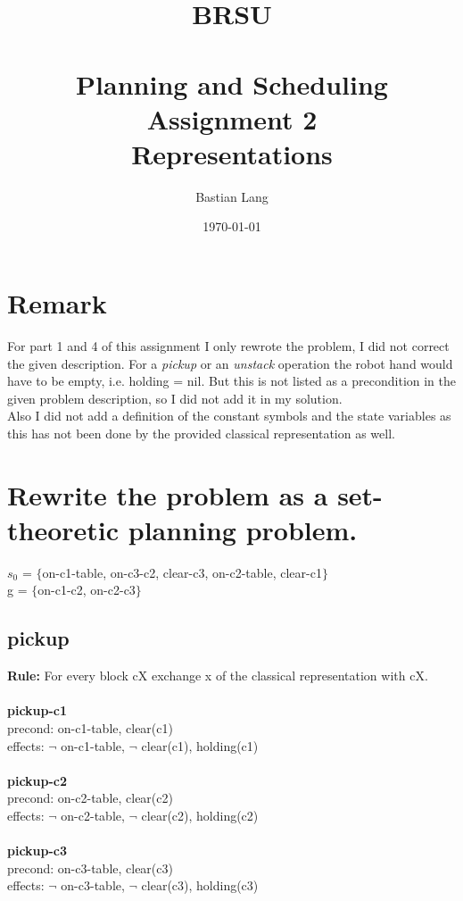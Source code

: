 \documentclass[paper=a4, fontsize=11pt]{scrartcl} %
\title{	
\normalfont \normalsize 
\textsc{BRSU} \\ [25pt] %
\horrule{0.5pt} \\[0.4cm] %
\huge Planning and Scheduling\\Assignment 2 \\
Representations %
\horrule{2pt} \\[0.5cm] %
}
\author{Bastian Lang} %
\date{\normalsize\today} %
\numberwithin{equation}{section} %
\numberwithin{figure}{section} %
\numberwithin{table}{section} %
\begin{document}
\maketitle %

\section{Remark}
For part 1 and 4 of this assignment I only rewrote the problem, I did not correct the given description. For a \textit{pickup} or an \textit{unstack} operation the robot hand would have to be empty, i.e. holding = nil. But this is not listed as a precondition in the given problem description, so I did not add it in my solution.\\
Also I did not add a definition of the constant symbols and the state variables as this has not been done by the provided classical representation as well. 

\section{Rewrite the problem as a set-theoretic planning problem.}
$s_0$ = $\{$on-c1-table, on-c3-c2, clear-c3, on-c2-table, clear-c1$\}$\\
g = $\{$on-c1-c2, on-c2-c3$\}$
\subsection{pickup}
\textbf{Rule:} For every block cX exchange x of the classical representation with cX.\\\\

\textbf{pickup-c1}\\
precond: on-c1-table, clear(c1)\\
effects: $\lnot$ on-c1-table, $\lnot$ clear(c1), holding(c1)\\\\

\textbf{pickup-c2}\\
precond: on-c2-table, clear(c2)\\
effects: $\lnot$ on-c2-table, $\lnot$ clear(c2), holding(c2)\\\\

\textbf{pickup-c3}\\
precond: on-c3-table, clear(c3)\\
effects: $\lnot$ on-c3-table, $\lnot$ clear(c3), holding(c3)\\
\end{document}

